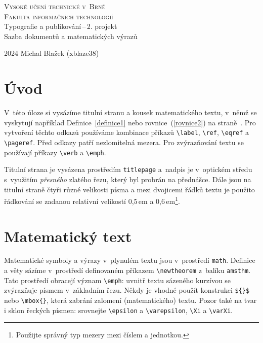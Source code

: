 \documentclass[a4paper, twocolumn, 11pt]{article}
\begin{document}
\begin{titlepage}
\begin{center}
    \Huge
    \textsc{Vysoké učení technické v~Brně\\[0.5em]
    \huge{Fakulta informačních technologií}}\\
    \LARGE{Typografie a publikování\,--\,2. projekt\\[0.6em]
    Sazba dokumentů a matematických výrazů}\\
\end{center}
{\Large 2024 \hfill Michal Blažek (xblaze38)}
\end{titlepage}

\section*{Úvod}

V~této úloze si vysázíme titulní stranu a kousek matematického textu, v~němž se vyskytují například Definice~\ref{definice1} nebo rovnice~(\ref{rovnice2}) na straně~\pageref{rovnice2}. Pro vytvoření těchto odkazů používáme kombinace příkazů \verb|\label|, \verb|\ref|, \verb|\eqref| a \verb|\pageref|. Před odkazy patří nezlomitelná mezera. Pro zvýrazňování textu se používají příkazy \verb|\verb| a \verb|\emph|.

Titulní strana je vysázena prostředím \texttt{titlepage} a~nadpis je v~optickém středu s~využitím \emph{přesného} zlatého řezu, který byl probrán na přednášce. Dále jsou na titulní straně čtyři různé velikosti písma a mezi dvojicemi řádků textu je použito řádkování se zadanou relativní velikostí 0,5\,em a 0,6\,em\footnote{Použijte správný typ mezery mezi číslem a jednotkou.}.

\section{Matematický text}

Matematické symboly a výrazy v~plynulém textu jsou v~prostředí \texttt{math}. Definice a věty sázíme v~prostředí definovaném příkazem \verb|\newtheorem| z~balíku \texttt{amsthm}. Tato prostředí obracejí význam \verb|\emph|: uvnitř textu sázeného kurzívou se zvýrazňuje písmem v~základním řezu. Někdy je vhodné použít konstrukci \verb|${}$| nebo \verb|\mbox{}|, která zabrání zalomení (matematického) textu. Pozor také na tvar i sklon řeckých písmen: srovnejte \verb|\epsilon| a \verb|\varepsilon|, \verb|\Xi| a \verb|\varXi|.
\end{document}
